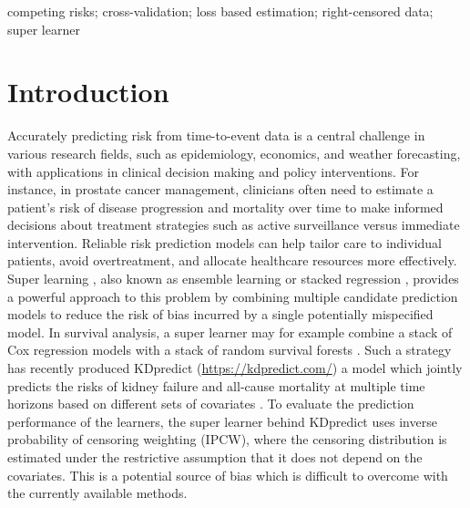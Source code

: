 \documentclass[lineno]{biometrika}
\newcommand{\1}{\mathds{1}}
\begin{document}
\begin{keywords}
competing risks; cross-validation; loss based estimation; right-censored data; super learner
\end{keywords}

\section{Introduction}
\label{sec:introduction}

Accurately predicting risk from time-to-event data is a central
challenge in various research fields, such as epidemiology, economics,
and weather forecasting, with applications in clinical decision making
and policy interventions. For instance, in prostate cancer management,
clinicians often need to estimate a patient’s risk of disease
progression and mortality over time to make informed decisions about
treatment strategies such as active surveillance versus immediate
intervention. Reliable risk prediction models can help tailor care to
individual patients, avoid overtreatment, and allocate healthcare
resources more effectively. Super learning \citep{van2007super}, also
known as ensemble learning or stacked regression
\citep{wolpert1992stacked,breiman1996stacked}, provides a powerful
approach to this problem by combining multiple candidate prediction
models to reduce the risk of bias incurred by a single potentially
mispecified model. In survival analysis, a super learner may for example combine a
stack of Cox regression models with a stack of random survival forests
\citep[][Section 8.4]{gerds2021medical}. Such a strategy has recently
produced KDpredict (\url{https://kdpredict.com/}) a model which
jointly predicts the risks of kidney failure and all-cause mortality
at multiple time horizons based on different sets of covariates
\citep{liu2024predicting}. To evaluate the prediction performance of
the learners, the super learner behind KDpredict uses inverse
probability of censoring weighting (IPCW), where the censoring
distribution is estimated under the restrictive assumption that it
does not depend on the covariates. This is a potential source of bias
which is difficult to overcome with the currently available methods.
\end{document}
